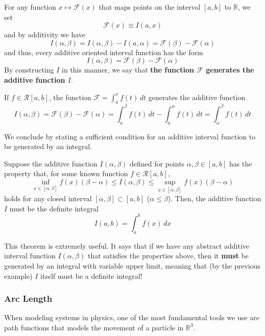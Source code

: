     \begin{lemma}
      For any function $x \mapsto \mathcal{F}(x)$ that maps points on the interval $[a, b]$ to $\mathbb{R}$, we set
      \[\mathcal{F}(x) \equiv I(a, x)\]
      and by additivity we have
      \[I(\alpha, \beta) = I(\alpha, \beta) - I(a, \alpha) = \mathcal{F}(\beta) - \mathcal{F}(\alpha)\]
      and thus, every additive oriented interval function has the form 
      \[I(\alpha, \beta) = \mathcal{F}(\beta) - \mathcal{F}(\alpha)\]
      By constructing $I$ in this manner, we say that \textbf{the function $\mathcal{F}$ generates the additive function $I$}. 
    \end{lemma}

    \begin{example}
    If $f \in \mathcal{R}[a, b]$, the function $\mathcal{F} = \int_a^x f(t)\,dt$ generates the additive function
    \[I(\alpha, \beta) = \mathcal{F}(\beta) - \mathcal{F}(\alpha) = \int_a^\beta f(t)\,dt - \int_a^\alpha f(t)\,dt = \int_\alpha^\beta f(t)\,dt\]
    \end{example}

    We conclude by stating a sufficient condition for an additive interval function to be generated by an integral. 
    \begin{theorem}
    Suppose the additive function $I(\alpha, \beta)$ defined for points $\alpha, \beta \in [a, b]$ has the property that, for some known function $f \in \mathcal{R}[a, b]$, 
    \[\inf_{x \in [\alpha, \beta]} f(x) (\beta - \alpha) \leq I(\alpha, \beta) \leq \sup_{x \in [\alpha, \beta]} f(x) (\beta - \alpha)\]
    holds for any closed interval $[\alpha, \beta] \subset [a, b]$ ($\alpha \leq \beta$). Then, the additive function $I$ must be the definite integral
    \[I(a, b) = \int_a^b f(x)\,dx\]
    \end{theorem}

    This theorem is extremely useful. It says that if we have any abstract additive interval function $I(\alpha, \beta)$ that satisfies the properties above, then it \textbf{must} be generated by an integral with variable upper limit, meaning that (by the previous example) $I$ itself must be a definite integral! 

    \subsubsection{Arc Length}
    When modeling systems in physics, one of the most fundamental tools we use are path functions that models the movement of a particle in $\mathbb{R}^3$. 

